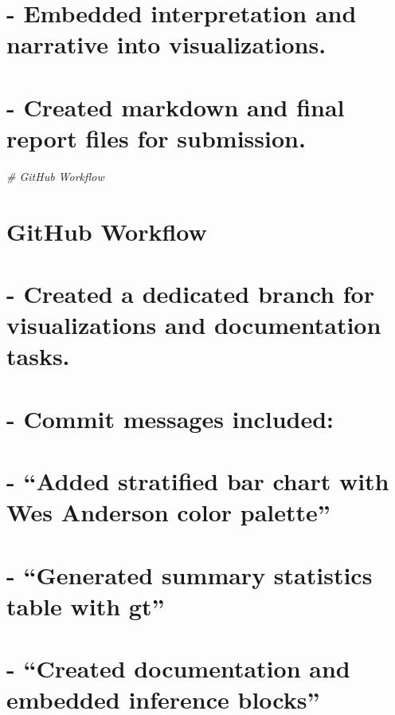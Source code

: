 \documentclass[
]{article}
\newenvironment{Shaded}{\begin{snugshade}}{\end{snugshade}}
\newcommand{\CommentTok}[1]{\textcolor[rgb]{0.56,0.35,0.01}{\textit{#1}}}
\begin{document}
\section{- Embedded interpretation and narrative into
visualizations.}\label{embedded-interpretation-and-narrative-into-visualizations.}

\section{- Created markdown and final report files for
submission.}\label{created-markdown-and-final-report-files-for-submission.}

\begin{Shaded}
\begin{Highlighting}[]
\CommentTok{\# GitHub Workflow}
\end{Highlighting}
\end{Shaded}

\section{GitHub Workflow}\label{github-workflow}

\section{- Created a dedicated branch for visualizations and
documentation
tasks.}\label{created-a-dedicated-branch-for-visualizations-and-documentation-tasks.}

\section{- Commit messages included:}\label{commit-messages-included}

\section{- ``Added stratified bar chart with Wes Anderson color
palette''}\label{added-stratified-bar-chart-with-wes-anderson-color-palette}

\section{- ``Generated summary statistics table with
gt''}\label{generated-summary-statistics-table-with-gt}

\section{- ``Created documentation and embedded inference
blocks''}\label{created-documentation-and-embedded-inference-blocks}
\end{document}
